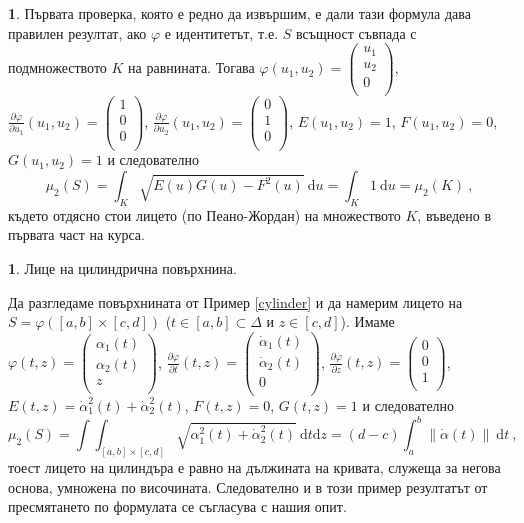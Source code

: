 \documentclass[11pt]{article}
\numberwithin{equation}{section}
\numberwithin{figure}{section}
\numberwithin{table}{section}
\theoremstyle{plain}
\theoremstyle{definition}
\theoremstyle{remark}
\theoremstyle{definition}
\theoremstyle{remark}
\theoremstyle{plain}
\theoremstyle{definition}
\theoremstyle{definition}
\newtheorem{example}[thm]{\protect\examplename}
\theoremstyle{plain}
\theoremstyle{plain}
\theoremstyle{plain}
\theoremstyle{definition}
\theoremstyle{plain}
\providecommand{\examplename}{Пример}
\begin{document}
\begin{example} Първата проверка, която е редно да извършим, е дали тази формула дава правилен резултат, ако $\varphi$ е идентитетът, т.е. $S$ всъщност съвпада с подмножеството $K$ на равнината. Тогава $\varphi(u_1,u_2) = \begin{pmatrix}
	u_1\\
    u_2\\
	0\\
\end{pmatrix}$, $\frac{\partial\varphi}{\partial u_1}(u_1,u_2) = \begin{pmatrix}
	1\\
	0\\
	0\\
\end{pmatrix}$, $\frac{\partial\varphi}{\partial u_2}(u_1,u_2) = \begin{pmatrix}
	0\\
	1\\
	0\\
\end{pmatrix}$, $E(u_1,u_2)=1$, $F(u_1,u_2)=0$, $G(u_1,u_2)=1$ и следователно
$$\mu_2(S)= \int_K \sqrt{E(u)G(u)-F^2(u)} \ \textrm{d}u = \int_K 1 \ \textrm{d}u = \mu_2(K) \ ,$$
където отдясно стои лицето (по Пеано-Жордан) на множеството $K$, въведено в първата част на курса.
\end{example}

\begin{example} Лице на цилиндрична повърхнина.

Да разгледаме повърхнината от Пример \ref{cylinder} и да намерим лицето на $S=\varphi([a,b]\times [c,d])$ ($t\in [a,b]\subset \Delta$ и $z\in [c,d]$). Имаме $\varphi(t,z) = \begin{pmatrix}
	\alpha_1(t)\\
	\alpha_2(t)\\
	z\\
\end{pmatrix}$, $\frac{\partial\varphi}{\partial t}(t,z) = \begin{pmatrix}
	\dot \alpha_1(t)\\
	\dot \alpha_2(t)\\
	0\\
\end{pmatrix}$, $\frac{\partial\varphi}{\partial z}(t,z) = \begin{pmatrix}
	0\\
	0\\
	1\\
\end{pmatrix}$, $E(t,z)=\dot \alpha_1^2(t)+\dot \alpha_2^2(t)$, $F(t,z)=0$, $G(t,z)=1$ и следователно
$$\mu_2(S)= \int\int_{[a,b]\times [c,d]} \sqrt{\alpha_1^2(t)+\dot \alpha_2^2(t)} \ \textrm{d}t\textrm{d}z = (d-c)\int_a^b \left\| \dot \alpha (t)\right\| \ \textrm{d}t  \ ,$$
тоест лицето на цилиндъра е равно на дължината на кривата, служеща за негова основа, умножена по височината. Следователно и в този пример резултатът от пресмятането по формулата се съгласува с нашия опит.
\end{example}
\end{document}
